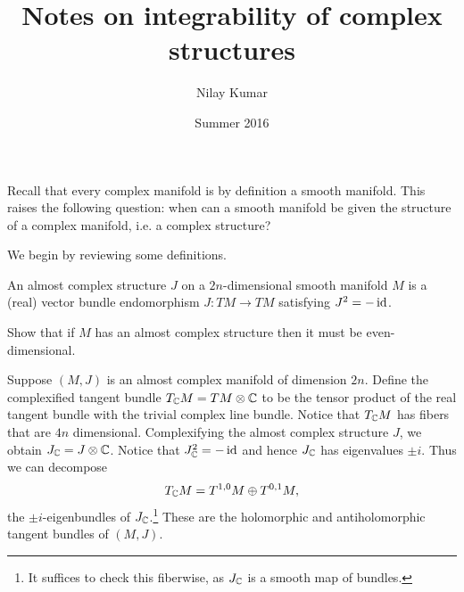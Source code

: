 \documentclass{amsart}
\title{Notes on integrability of complex structures}
\author{Nilay Kumar}
\date{Summer 2016}
\begin{document}
\maketitle

Recall that every complex manifold is by definition a smooth manifold. This raises the following question:
when can a smooth manifold be given the structure of a complex manifold, i.e. a complex structure?

We begin by reviewing some definitions.
\begin{definition}
    An {\color{blue}almost complex structure} $J$ on a $2n$-dimensional smooth manifold $M$ is
    a (real) vector bundle endomorphism $J:TM\to TM$ satisfying $J^2=-\operatorname{id}$.
\end{definition}

\begin{exercise}
    Show that if $M$ has an almost complex structure then it must be even-dimensional.
\end{exercise}

Suppose $(M, J)$ is an almost complex manifold of dimension $2n$. Define the {\color{blue}complexified tangent bundle}
$T_{\mathbb{C}} M=TM\otimes\mathbb{C}$ to be the tensor product of the real tangent bundle with the trivial complex line bundle. Notice that
$T_{\mathbb{C}} M$ has fibers that are $4n$ dimensional. Complexifying the almost complex structure $J$, we obtain $J_{\mathbb{C}}=J\otimes\mathbb{C}$.
Notice that $J_{\mathbb{C}}^2=-\operatorname{id}$ and hence $J_{\mathbb{C}}$ has eigenvalues $\pm i$. Thus we can decompose
\begin{equation*}
    T_{\mathbb{C}} M = T^{1,0}M \oplus T^{0,1}M,
\end{equation*}
the $\pm i$-eigenbundles of $J_{\mathbb{C}}$.\footnote{It suffices to check this fiberwise, as $J_{\mathbb{C}}$ is a smooth map of bundles.}
These are the {\color{blue} holomorphic and antiholomorphic tangent bundles} of $(M,J)$.
\end{document}
